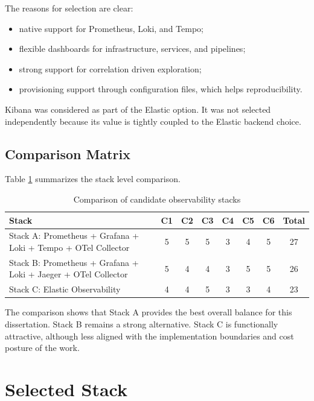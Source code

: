 The reasons for selection are clear:
\begin{itemize}
    \item native support for Prometheus, Loki, and Tempo;
    \item flexible dashboards for infrastructure, services, and pipelines;
    \item strong support for correlation driven exploration;
    \item provisioning support through configuration files, which helps reproducibility.
\end{itemize}

Kibana was considered as part of the Elastic option. It was not selected independently because its value is tightly coupled to the Elastic backend choice.

\subsection{Comparison Matrix}
\label{subsec:comparison_matrix}

Table \ref{tab:stack_comparison} summarizes the stack level comparison.

\begin{table}[htbp]
\centering
\caption{Comparison of candidate observability stacks}
\label{tab:stack_comparison}
{\small
\begin{tabular}{@{}p{}ccccccc@{}}
\toprule
\textbf{Stack} & \textbf{C1} & \textbf{C2} & \textbf{C3} & \textbf{C4} & \textbf{C5} & \textbf{C6} & \textbf{Total} \\
\midrule
Stack A: Prometheus + Grafana + Loki + Tempo + OTel Collector & 5 & 5 & 5 & 3 & 4 & 5 & 27 \\
Stack B: Prometheus + Grafana + Loki + Jaeger + OTel Collector & 5 & 4 & 4 & 3 & 5 & 5 & 26 \\
Stack C: Elastic Observability & 4 & 4 & 5 & 3 & 3 & 4 & 23 \\
\bottomrule
\end{tabular}}
\end{table}

The comparison shows that Stack A provides the best overall balance for this dissertation. Stack B remains a strong alternative. Stack C is functionally attractive, although less aligned with the implementation boundaries and cost posture of the work.

\section{Selected Stack}
\label{sec:selected_stack}


